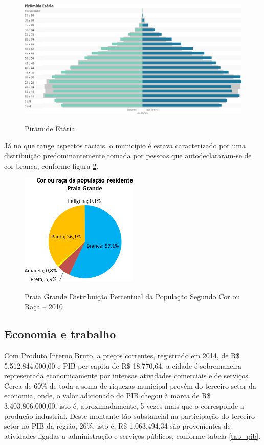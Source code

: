 	\begin{figure}[!htb]
		\centering
		\caption{Pirâmide Etária}
		\includegraphics[width=1\textwidth]{img/ibge2017c_pira_etaria.png}
		\label{pira_etaria}
	\end{figure}
	
	Já no que tange aspectos raciais, o município é estava caracterizado por uma distribuição predominantemente tomada por pessoas que autodeclararam-se de cor branca, conforme figura \ref{comp_racial}.

	\begin{figure}[!htb]
		\centering
		\caption{Praia Grande \textendash Distribuição Percentual da População Segundo Cor ou Raça -- 2010}
		\includegraphics[width=0.5\textwidth]{img/polis_raca.png}
		\label{comp_racial}
	\end{figure}
	
	\subsection{Economia e trabalho}
	
	Com Produto Interno Bruto, a preços correntes, registrado em 2014, de R\$ 5.512.844.000,00 e PIB per capita de R\$ 18.770,64, a cidade é sobremaneira representada economicamente por intensas atividades comerciais e de serviços. Cerca de 60\% de toda a soma de riquezas municipal provém do terceiro setor da economia, onde, o valor adicionado do PIB chegou à marca de R\$ 3.403.806.000,00, isto é, aproximadamente, 5 vezes mais que o corresponde a produção industrial. Deste montante tão substancial na participação do terceiro setor no PIB da região, 26\%, isto é, R\$ 1.063.494,34 são provenientes de atividades ligadas a administração e serviços públicos, conforme tabela \ref{tab_pib}.

